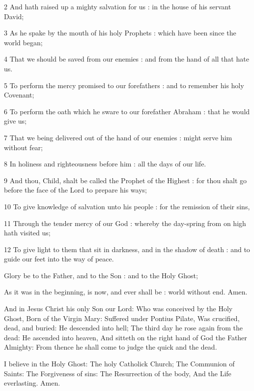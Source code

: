 
2 And hath raised up a mighty salvation for us : in the house of his servant David;

3 As he spake by the mouth of his holy Prophets : which have been since the world began;

4 That we should be saved from our enemies : and from the hand of all that hate us.

5 To perform the mercy promised to our forefathers : and to remember his holy Covenant;

6 To perform the oath which he sware to our forefather Abraham : that he would give us;

7 That we being delivered out of the hand of our enemies : might serve him without fear;

8 In holiness and righteousness before him : all the days of our life.

9 And thou, Child, shalt be called the Prophet of the Highest : for thou shalt go before the face of the Lord to prepare his ways;

10 To give knowledge of salvation unto his people : for the remission of their sins,

11 Through the tender mercy of our God : whereby the day-spring from on high hath visited us;

12 To give light to them that sit in darkness, and in the shadow of death : and to guide our feet into the way of peace.

Glory be to the Father, and to the Son : and to the Holy Ghost;

As it was in the beginning, is now, and ever shall be : world without end. Amen.



And in Jesus Christ his only Son our Lord: Who was conceived by the Holy Ghost, Born of the Virgin Mary: Suffered under Pontius Pilate, Was crucified, dead, and buried: He descended into hell; The third day he rose again from the dead: He ascended into heaven, And sitteth on the right hand of God the Father Almighty: From thence he shall come to judge the quick and the dead.

I believe in the Holy Ghost: The holy Catholick Church; The Communion of Saints: The Forgiveness of sins: The Resurrection of the body, And the Life everlasting. Amen.



